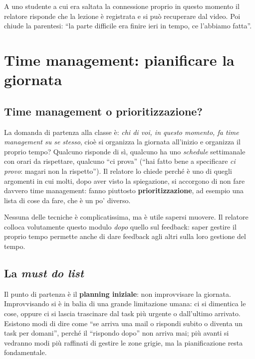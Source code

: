 A uno studente a cui era saltata la connessione proprio in questo momento il
relatore risponde che la lezione è registrata e si può recuperare dal video.
Poi chiude la parentesi: ``la parte difficile era finire ieri in tempo, ce
l'abbiamo fatta''.

\section{Time management: pianificare la giornata}
\label{sec:z2-pianificare}

\subsection{Time management o prioritizzazione?}

La domanda di partenza alla classe è: \emph{chi di voi, in questo momento, fa
time management su se stesso}, cioè si organizza la giornata all'inizio e
organizza il proprio tempo? Qualcuno risponde di sì, qualcuno ha uno
\emph{schedule} settimanale con orari da rispettare, qualcuno ``ci prova''
(``hai fatto bene a specificare \emph{ci provo}: magari non la rispetto''). Il
relatore lo chiede perché è uno di quegli argomenti in cui molti, dopo aver
visto la spiegazione, si accorgono di non fare davvero time management: fanno
piuttosto \textbf{prioritizzazione}, ad esempio una lista di cose da fare, che
è un po' diverso.

Nessuna delle tecniche è complicatissima, ma è utile sapersi muovere. Il
relatore colloca volutamente questo modulo \emph{dopo} quello sul feedback: saper
gestire il proprio tempo permette anche di dare feedback agli altri sulla loro
gestione del tempo.

\subsection{La \emph{must do list}}

Il punto di partenza è il \textbf{planning iniziale}: non improvvisare la
giornata. Improvvisando si è in balia di una grande limitazione umana: ci si
dimentica le cose, oppure ci si lascia trascinare dal task più urgente o
dall'ultimo arrivato. Esistono modi di dire come ``se arriva una mail o rispondi
subito o diventa un task per domani'', perché il ``rispondo dopo'' non arriva
mai; più avanti si vedranno modi più raffinati di gestire le zone grigie, ma la
pianificazione resta fondamentale.

